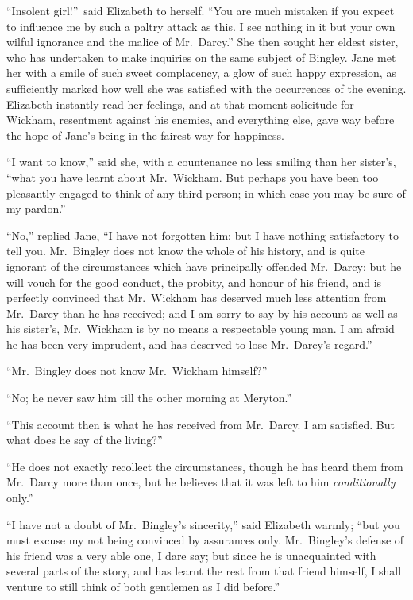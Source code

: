 \documentclass[12pt,english]{book}
\begin{document}
{}``Insolent girl!''\ said Elizabeth to herself. {}``You are much
mistaken if you expect to influence me by such a paltry attack as
this. I see nothing in it but your own wilful ignorance and the malice
of Mr.\ Darcy.'' She then sought her eldest sister, who has undertaken
to make inquiries on the same subject of Bingley. Jane met her with
a smile of such sweet complacency, a glow of such happy expression,
as sufficiently marked how well she was satisfied with the occurrences
of the evening. Elizabeth instantly read her feelings, and at that
moment solicitude for Wickham, resentment against his enemies, and
everything else, gave way before the hope of Jane's being in the fairest
way for happiness.

{}``I want to know,'' said she, with a countenance no less smiling
than her sister's, {}``what you have learnt about Mr.\ Wickham.
But perhaps you have been too pleasantly engaged to think of any third
person; in which case you may be sure of my pardon.''

{}``No,'' replied Jane, {}``I have not forgotten him; but I have
nothing satisfactory to tell you. Mr.\ Bingley does not know the
whole of his history, and is quite ignorant of the circumstances which
have principally offended Mr.\ Darcy; but he will vouch for the good
conduct, the probity, and honour of his friend, and is perfectly convinced
that Mr.\ Wickham has deserved much less attention from Mr.\ Darcy
than he has received; and I am sorry to say by his account as well
as his sister's, Mr.\ Wickham is by no means a respectable young
man. I am afraid he has been very imprudent, and has deserved to lose
Mr.\ Darcy's regard.''

{}``Mr.\ Bingley does not know Mr.\ Wickham himself?''\ 

{}``No; he never saw him till the other morning at Meryton.''

{}``This account then is what he has received from Mr.\ Darcy. I
am satisfied. But what does he say of the living?''\ 

{}``He does not exactly recollect the circumstances, though he has
heard them from Mr.\ Darcy more than once, but he believes that it
was left to him \textit{conditionally} only.''

{}``I have not a doubt of Mr.\ Bingley's sincerity,'' said Elizabeth
warmly; {}``but you must excuse my not being convinced by assurances
only. Mr.\ Bingley's defense of his friend was a very able one, I
dare say; but since he is unacquainted with several parts of the story,
and has learnt the rest from that friend himself, I shall venture
to still think of both gentlemen as I did before.''
\end{document}
